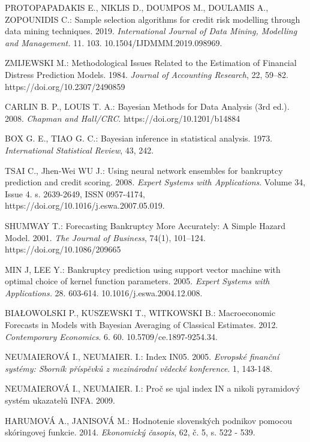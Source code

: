 \begin{thebibliography}{99}
     PROTOPAPADAKIS E., NIKLIS D., DOUMPOS M., DOULAMIS A., ZOPOUNIDIS C.: Sample selection algorithms for credit risk modelling through data mining techniques. 2019.
    \emph{International Journal of Data Mining, Modelling and Management.} 11. 103. 10.1504/IJDMMM.2019.098969.

     ZMIJEWSKI M.: Methodological Issues Related to the Estimation of Financial Distress Prediction Models. 1984. \emph{Journal of Accounting Research}, 22, 59–82. https://doi.org/10.2307/2490859

     CARLIN B. P., LOUIS T. A.: Bayesian Methods for Data Analysis (3rd ed.). 2008. \emph{Chapman and Hall/CRC}. https://doi.org/10.1201/b14884

     BOX G. E., TIAO G. C.: Bayesian inference in statistical analysis. 1973. \emph{International Statistical Review}, 43, 242.
    
     TSAI C., Jhen-Wei WU J.: Using neural network ensembles for bankruptcy prediction and credit scoring. 2008.
    \emph{Expert Systems with Applications}. Volume 34, Issue 4. s. 2639-2649, ISSN 0957-4174, https://doi.org/10.1016/j.eswa.2007.05.019.

     SHUMWAY T.: Forecasting Bankruptcy More Accurately: A Simple Hazard Model. 2001.
    \emph{The Journal of Business}, 74(1), 101–124. https://doi.org/10.1086/209665

     MIN J, LEE Y.: Bankruptcy prediction using support vector machine with optimal choice of kernel function parameters. 2005.
    \emph{Expert Systems with Applications.} 28. 603-614. 10.1016/j.eswa.2004.12.008.

     BIAŁOWOLSKI P., KUSZEWSKI T., WITKOWSKI B.: Macroeconomic Forecasts in Models with Bayesian Averaging of Classical Estimates.
    2012. \emph{Contemporary Economics}. 6. 60. 10.5709/ce.1897-9254.34.

     NEUMAIEROVÁ I., NEUMAIER. I.: Index IN05. 2005.
    \emph{Evropské finanční systémy: Sborník příspěvků z mezinárodní vědecké konference}. 1, 143-148.

     NEUMAIEROVÁ I., NEUMAIER. I.: Proč se ujal index IN a nikoli pyramidový systém ukazatelů INFA. 2009.

     HARUMOVÁ A., JANISOVÁ M.: Hodnotenie slovenských podnikov pomocou skóringovej funkcie. 2014. \emph{Ekonomický časopis}, 62, č. 5, s. 522 - 539.


\end{thebibliography}
